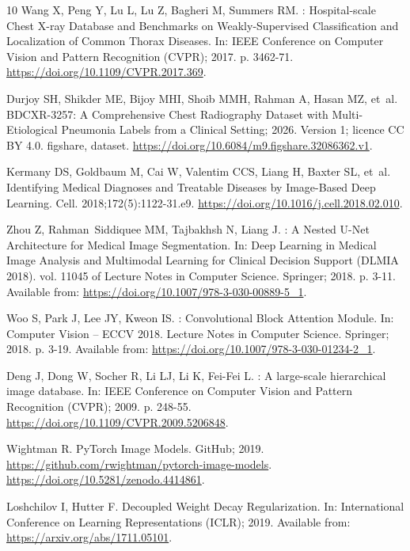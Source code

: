 \begin{thebibliography}{10}
Wang X, Peng Y, Lu L, Lu Z, Bagheri M, Summers RM.
: Hospital-scale Chest {X}-ray Database and Benchmarks
  on Weakly-Supervised Classification and Localization of Common Thorax
  Diseases.
\newblock In: {IEEE} Conference on Computer Vision and Pattern Recognition
  ({CVPR}); 2017. p. 3462-71.
\newblock \url{https://doi.org/10.1109/CVPR.2017.369}.

Durjoy SH, Shikder ME, Bijoy MHI, Shoib MMH, Rahman A, Hasan MZ, et~al.
  {BDCXR-3257}: A Comprehensive Chest Radiography Dataset with
  Multi-Etiological Pneumonia Labels from a Clinical Setting; 2026.
\newblock Version 1; licence CC BY 4.0.
\newblock figshare, dataset.
\newblock \url{https://doi.org/10.6084/m9.figshare.32086362.v1}.

Kermany DS, Goldbaum M, Cai W, Valentim CCS, Liang H, Baxter SL, et~al.
\newblock Identifying Medical Diagnoses and Treatable Diseases by Image-Based
  Deep Learning.
\newblock Cell. 2018;172(5):1122-31.e9.
\newblock \url{https://doi.org/10.1016/j.cell.2018.02.010}.

Zhou Z, Rahman~Siddiquee MM, Tajbakhsh N, Liang J.
: A Nested {U-Net} Architecture for Medical Image
  Segmentation.
\newblock In: Deep Learning in Medical Image Analysis and Multimodal Learning
  for Clinical Decision Support ({DLMIA} 2018). vol. 11045 of Lecture Notes in
  Computer Science. Springer; 2018. p. 3-11.
\newblock Available from: \url{https://doi.org/10.1007/978-3-030-00889-5_1}.

Woo S, Park J, Lee JY, Kweon IS.
: Convolutional Block Attention Module.
\newblock In: Computer Vision -- {ECCV} 2018. Lecture Notes in Computer
  Science. Springer; 2018. p. 3-19.
\newblock Available from: \url{https://doi.org/10.1007/978-3-030-01234-2_1}.

Deng J, Dong W, Socher R, Li LJ, Li K, Fei-Fei L.
: A large-scale hierarchical image database.
\newblock In: {IEEE} Conference on Computer Vision and Pattern Recognition
  ({CVPR}); 2009. p. 248-55.
\newblock \url{https://doi.org/10.1109/CVPR.2009.5206848}.

Wightman R. {PyTorch} Image Models. GitHub; 2019.
\newblock \url{https://github.com/rwightman/pytorch-image-models}.
\newblock \url{https://doi.org/10.5281/zenodo.4414861}.

Loshchilov I, Hutter F.
\newblock Decoupled Weight Decay Regularization.
\newblock In: International Conference on Learning Representations ({ICLR});
  2019. Available from: \url{https://arxiv.org/abs/1711.05101}.


\end{thebibliography}

